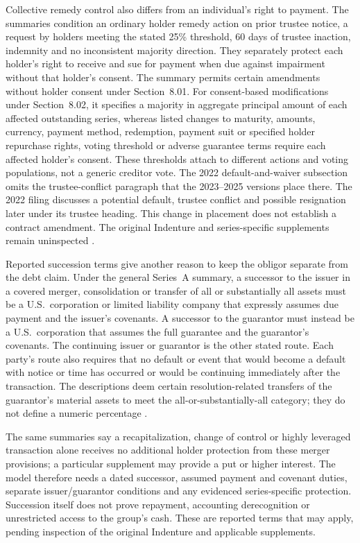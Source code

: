 Collective remedy control also differs from an individual's right to payment.
The summaries condition an ordinary holder remedy action on prior trustee
notice, a request by holders meeting the stated 25\% threshold, 60 days of
trustee inaction, indemnity and no inconsistent majority direction. They
separately protect each holder's right to receive and sue for payment when due
against impairment without that holder's consent. The summary permits certain
amendments without holder consent under Section~8.01. For consent-based
modifications under Section~8.02, it specifies a majority in aggregate
principal amount of each affected outstanding series, whereas
listed changes to maturity, amounts, currency, payment method, redemption,
payment suit or specified holder repurchase rights, voting threshold or adverse guarantee terms require each
affected holder's consent. These thresholds attach to different actions and
voting populations, not a generic creditor vote. The 2022 default-and-waiver
subsection omits the trustee-conflict paragraph that the 2023--2025 versions
place there. The 2022 filing discusses a potential default, trustee conflict
and possible resignation later under its trustee heading. This change in
placement does not establish a contract amendment. The original Indenture and
series-specific supplements remain uninspected
\citep{jpmorgan2022tenk,jpmorgan2023tenk,jpmorgan2024tenk,jpmorgan2025tenk}.

\newpage
Reported succession terms give another reason to keep the obligor separate
from the debt claim. Under the general Series~A summary, a successor to the
issuer in a covered merger, consolidation or transfer of all or substantially
all assets must be a U.S.\ corporation or limited liability company that
expressly assumes due payment and the issuer's covenants. A successor to the
guarantor must instead be a U.S.\ corporation that assumes the full guarantee
and the guarantor's covenants. The continuing issuer or guarantor is the other
stated route. Each party's route also requires that no default or event that
would become a default with notice or time has occurred or would be continuing
immediately after the transaction. The descriptions deem certain
resolution-related transfers of the guarantor's material assets to meet the
all-or-substantially-all category; they do not define a numeric percentage
\citep{jpmorgan2022tenk,jpmorgan2023tenk,jpmorgan2024tenk,jpmorgan2025tenk}.

The same summaries say a recapitalization, change of control or highly
leveraged transaction alone receives no additional holder protection from
these merger provisions; a particular supplement may provide a put or higher
interest. The model therefore needs a dated successor, assumed payment and
covenant duties, separate issuer/guarantor conditions and any evidenced
series-specific protection. Succession itself does not prove repayment,
accounting derecognition or unrestricted access to the group's cash. These
are reported terms that may apply, pending inspection of the original
Indenture and applicable supplements.


